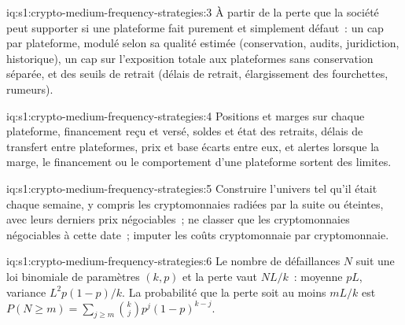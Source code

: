 \begin{solution}{iq:s1:crypto-medium-frequency-strategies:3}
À partir de la perte que la société peut supporter si une plateforme fait purement et simplement défaut~: un cap par plateforme, modulé selon sa qualité estimée (conservation, audits, juridiction, historique), un
cap sur l'exposition totale aux plateformes sans conservation séparée, et des seuils de retrait (délais de retrait, élargissement des fourchettes, rumeurs).
\end{solution}

\begin{solution}{iq:s1:crypto-medium-frequency-strategies:4}
Positions et marges sur chaque plateforme, financement reçu et versé, soldes et état des retraits, délais de transfert entre plateformes, prix et base
écarts entre eux, et alertes lorsque la marge, le financement ou le comportement d'une plateforme sortent des limites.
\end{solution}

\begin{solution}{iq:s1:crypto-medium-frequency-strategies:5}
Construire l'univers tel qu'il était chaque semaine, y compris les cryptomonnaies radiées par la suite ou éteintes, avec leurs derniers prix négociables~; ne classer que les cryptomonnaies négociables à cette date~;
imputer les coûts cryptomonnaie par cryptomonnaie.
\end{solution}

\begin{solution}{iq:s1:crypto-medium-frequency-strategies:6}
Le nombre de défaillances $N$ suit une loi binomiale de paramètres $(k, p)$ et la perte vaut $NL/k$~: moyenne $pL$, variance $L^2p(1 - p)/k$. La probabilité que la perte soit au moins
$mL/k$ est $P(N \ge m) = \sum_{j \ge m}\binom{k}{j}p^j(1 - p)^{k - j}$.
\end{solution}
